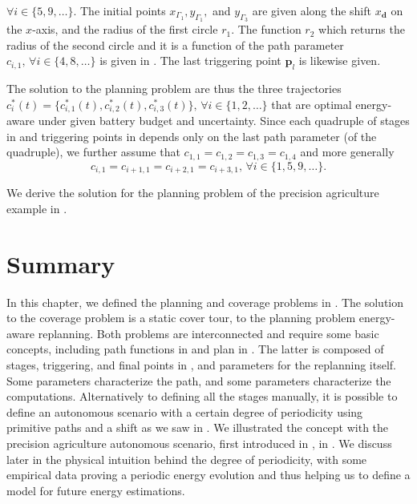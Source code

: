 $\forall i\in\{5,9,\dots\}$. The initial points $x_{\Gamma_1},y_{\Gamma_1},$ and $y_{\Gamma_3}$ are given along the shift $x_\mathbf{d}$ on the $x$-axis, and the radius of the first circle $r_1$. The function $r_2$ which returns the radius of the second circle and it is a function of the path parameter $c_{i,1},\,\forall i\in\{4,8,\dots\}$ is given in . The last triggering point $\mathbf{p}_l$ is likewise given.

The solution to the planning problem are thus the three trajectories $c_i^*(t)=\{c_{i,1}^*(t),c_{i,2}^*(t),c_{i,3}^*(t)\},\,\forall i\in\{1,2,\dots\}$ that are optimal energy-aware under given battery budget and uncertainty. 
Since each quadruple of stages in  and triggering points in  depends only on the last path parameter (of the quadruple), we further assume that $c_{1,1}=c_{1,2}=c_{1,3}=c_{1,4}$ and more generally 
\begin{equation}
c_{i,1}=c_{i+1,1}=c_{i+2,1}=c_{i+3,1},\,\forall i\in\{1,5,9,\dots\}.
\end{equation}

We derive the solution for the planning problem of the precision agriculture example in .


\section{Summary}

In this chapter, we defined the planning and coverage problems in . The solution to the coverage problem is a static cover tour, to the planning problem energy-aware replanning. Both problems are interconnected and require some basic concepts, including path functions in  and plan in . The latter is composed of stages, triggering, and final points in , and parameters for the replanning itself. Some parameters characterize the path, and some parameters characterize the computations. 
Alternatively to defining all the stages manually, it is possible to define an autonomous scenario with a certain degree of periodicity using primitive paths and a shift as we saw in . We illustrated the concept with the precision agriculture autonomous scenario, first introduced in , in . We discuss later in  the physical intuition behind the degree of periodicity, with some empirical data proving a periodic energy evolution and thus helping us to define a model for future energy estimations.